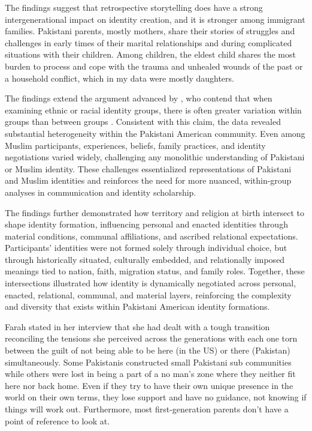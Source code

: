 The findings suggest that retrospective storytelling does have a strong intergenerational impact on identity creation, and it is stronger among immigrant families. Pakistani parents, mostly mothers, share their stories of struggles and challenges in early times of their marital relationships and during complicated situations with their children. Among children, the eldest child shares the most burden to process and cope with the trauma and unhealed wounds of the past or a household conflict, which in my data were mostly daughters. 

The findings extend the argument advanced by \citet{shinCommunicationTheoryIdentity2017}, who contend that when examining ethnic or racial identity groups, there is often greater variation within groups than between groups \citep[p.~3]{shinCommunicationTheoryIdentity2017}. Consistent with this claim, the data revealed substantial heterogeneity within the Pakistani American community. Even among Muslim participants, experiences, beliefs, family practices, and identity negotiations varied widely, challenging any monolithic understanding of Pakistani or Muslim identity. These challenges essentialized representations of Pakistani and Muslim identities and reinforces the need for more nuanced, within-group analyses in communication and identity scholarship.

The findings further demonstrated how territory and religion at birth intersect to shape identity formation, influencing personal and enacted identities through material conditions, communal affiliations, and ascribed relational expectations. Participants’ identities were not formed solely through individual choice, but through historically situated, culturally embedded, and relationally imposed meanings tied to nation, faith, migration status, and family roles. Together, these intersections illustrated how identity is dynamically negotiated across personal, enacted, relational, communal, and material layers, reinforcing the complexity and diversity that exists within Pakistani American identity formations.

Farah stated in her interview that she had dealt with a tough transition reconciling the tensions she perceived across the generations with each one torn between the guilt of not being able to be here (in the US) or there (Pakistan) simultaneously. Some Pakistanis constructed small Pakistani sub communities while others were lost in being a part of a no man's zone where they neither fit here nor back home. Even if they try to have their own unique presence in the world on their own terms, they lose support and have no guidance, not knowing if things will work out. Furthermore, most first-generation parents don’t have a point of reference to look at.

